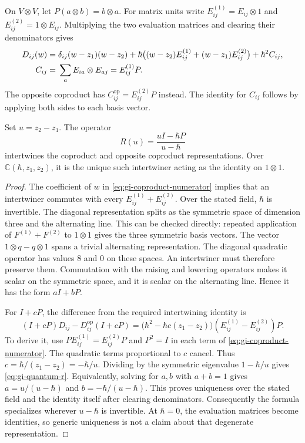 On $V\otimes V$, let $P(a\otimes b)=b\otimes a$.
For matrix units write $E_{ij}^{(1)}=E_{ij}\otimes1$ and $E_{ij}^{(2)}=1\otimes E_{ij}$.
Multiplying the two evaluation matrices and clearing their denominators gives
\begin{align}
 D_{ij}(w)={}&\delta_{ij}(w-z_1)(w-z_2)
 +\hbar\bigl((w-z_2)E_{ij}^{(1)}+(w-z_1)E_{ij}^{(2)}\bigr)
 +\hbar^2 C_{ij},\label{eq:gi-coproduct-numerator}\\
 C_{ij}={}&\sum_a E_{ia}\otimes E_{aj}=E_{ij}^{(1)}P.\notag
\end{align}
The opposite coproduct has $C_{ij}^{\mathrm{op}}=E_{ij}^{(2)}P$ instead.
The identity for $C_{ij}$ follows by applying both sides to each basis vector.

\begin{theorem}\label{thm:gi-intertwiner}
Set $u=z_2-z_1$.
The operator
\begin{equation}\label{eq:gi-quantum-r}
 R(u)=\frac{uI-\hbar P}{u-\hbar}
\end{equation}
intertwines the coproduct and opposite coproduct representations.
Over $\mathbb C(\hbar,z_1,z_2)$, it is the unique such intertwiner acting as the identity on $1\otimes1$.
\end{theorem}
\begin{proof}
The coefficient of $w$ in \eqref{eq:gi-coproduct-numerator} implies that an intertwiner commutes with every $E_{ij}^{(1)}+E_{ij}^{(2)}$.
Over the stated field, $\hbar$ is invertible.
The diagonal representation splits as the symmetric space of dimension three and the alternating line.
This can be checked directly: repeated application of $F^{(1)}+F^{(2)}$ to $1\otimes1$ gives the three symmetric basis vectors.
The vector $1\otimes q-q\otimes1$ spans a trivial alternating representation.
The diagonal quadratic operator has values $8$ and $0$ on these spaces.
An intertwiner must therefore preserve them.
Commutation with the raising and lowering operators makes it scalar on the symmetric space, and it is scalar on the alternating line.
Hence it has the form $aI+bP$.

For $I+cP$, the difference from the required intertwining identity is
\[
 (I+cP)D_{ij}-D_{ij}^{\mathrm{op}}(I+cP)
 =\bigl(\hbar^2-\hbar c(z_1-z_2)\bigr)
                     (E_{ij}^{(1)}-E_{ij}^{(2)})P.
\]
To derive it, use $PE_{ij}^{(1)}=E_{ij}^{(2)}P$ and $P^2=I$ in each term of \eqref{eq:gi-coproduct-numerator}.
The quadratic terms proportional to $c$ cancel.
Thus $c=\hbar/(z_1-z_2)=-\hbar/u$.
Dividing by the symmetric eigenvalue $1-\hbar/u$ gives \eqref{eq:gi-quantum-r}.
Equivalently, solving for $a,b$ with $a+b=1$ gives $a=u/(u-\hbar)$ and $b=-\hbar/(u-\hbar)$.
This proves uniqueness over the stated field and the identity itself after clearing denominators.
Consequently the formula specializes wherever $u-\hbar$ is invertible.
At $\hbar=0$, the evaluation matrices become identities, so generic uniqueness is not a claim about that degenerate representation.
\end{proof}

